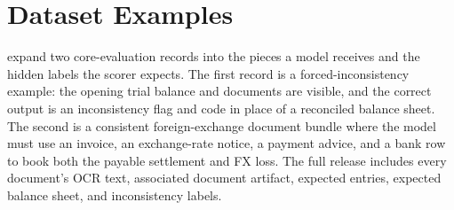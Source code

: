 \section{Dataset Examples}
\label{appx:dataset-examples}

 expand two core-evaluation records into the pieces a model receives and the hidden labels the scorer expects. The first record is a forced-inconsistency example: the opening trial balance and documents are visible, and the correct output is an inconsistency flag and code in place of a reconciled balance sheet. The second is a consistent foreign-exchange document bundle where the model must use an invoice, an exchange-rate notice, a payment advice, and a bank row to book both the payable settlement and FX loss. The full release includes every document's OCR text, associated document artifact, expected entries, expected balance sheet, and inconsistency labels.

